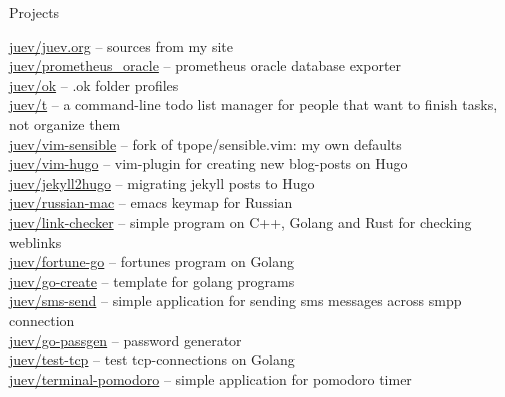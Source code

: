 \documentclass{resume} %
\begin{document}

\begin{rSection}{Projects}

\href{https://github.com/juev/juev.org}{juev/juev.org} -- sources from my site \\ %
\href{https://github.com/juev/prometheus\_oracle}{juev/prometheus\_oracle} -- prometheus oracle database exporter \\ %
\href{https://github.com/juev/ok}{juev/ok} -- .ok folder profiles  \\ %
\href{https://github.com/juev/t}{juev/t} -- a command-line todo list manager for people that want to finish tasks, not organize them \\ %
\href{https://github.com/juev/vim-sensible}{juev/vim-sensible} -- fork of tpope/sensible.vim: my own defaults \\ %
\href{https://github.com/juev/vim-hugo}{juev/vim-hugo} -- vim-plugin for creating new blog-posts on Hugo \\ %
\href{https://github.com/juev/jekyll2hugo}{juev/jekyll2hugo} -- migrating jekyll posts to Hugo \\ %
\href{https://github.com/juev/russian-mac}{juev/russian-mac} -- emacs keymap for Russian \\ %
\href{https://github.com/juev/link-checker}{juev/link-checker} -- simple program on C++, Golang and Rust for checking weblinks \\ %
\href{https://github.com/juev/fortune-go}{juev/fortune-go} -- fortunes program on Golang \\ %
\href{https://github.com/juev/go-create}{juev/go-create} -- template for golang programs \\ %
\href{https://github.com/juev/sms-send}{juev/sms-send} -- simple application for sending sms messages across smpp connection \\ %
\href{https://github.com/juev/go-passgen}{juev/go-passgen} -- password generator \\ %
\href{https://github.com/juev/test-tcp}{juev/test-tcp} -- test tcp-connections on Golang \\ %
\href{https://github.com/juev/terminal-pomodoro}{juev/terminal-pomodoro} -- simple application for pomodoro timer \\ %

\end{rSection}
\end{document}
